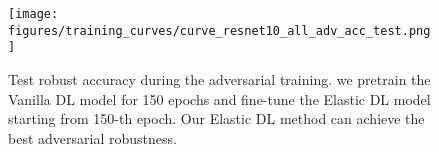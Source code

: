 \begin{figure}[h!]
    \centering
    \texttt{[image: figures/training\_curves/curve\_resnet10\_all\_adv\_acc\_test.png]}
    \vspace{-0.2in}
    \caption{Test robust accuracy during the adversarial training. we pretrain
the Vanilla DL model for 150 epochs and fine-tune the
Elastic DL model starting from 150-th epoch. Our Elastic DL method can achieve the best adversarial robustness.
    }
    \label{fig:curve_resnet10_all_adv_acc_test}
    \vspace{-0.2in}
\end{figure}









